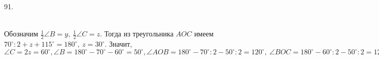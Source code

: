 91. \begin{figure}[ht!]
\end{figure}\\
Обозначим $\frac{1}{2}\angle B=y,\ \frac{1}{2}\angle C=z.$ Тогда из треугольника $AOC$ имеем $70^\circ:2+z+115^\circ=180^\circ,\ z=30^\circ.$ Значит, $\angle C=2z=60^\circ, \angle B=180^\circ-70^\circ-60^\circ=50^\circ, \angle AOB=180^\circ-70^\circ:2-50^\circ:2=120^\circ,\ \angle BOC=180^\circ-60^\circ:2-50^\circ:2=125^\circ.$\\
